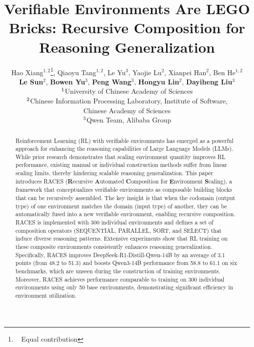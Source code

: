 \documentclass{article}
\title{Verifiable Environments Are LEGO Bricks: Recursive Composition for Reasoning Generalization}
\author{
\hspace{-2px}
Hao Xiang${}^{1,2}$\thanks{~ Equal contribution},
Qiaoyu Tang${}^{1,2}$\footnotemark[1],
Le Yu${}^{3}$,
Yaojie Lu${}^{2}$,
Xianpei Han${}^{2}$,
Ben He${}^{1,2}$
\\
\textbf{Le Sun}${}^{2}$,
\textbf{Bowen Yu}${}^{3}$,
\textbf{Peng Wang}${}^{3}$,
\textbf{Hongyu Lin}${}^{2}$,
\textbf{Dayiheng Liu}${}^{3}$ 
\vspace{5px}
\\
$^{\rm 1}$University of Chinese Academy of Sciences \vspace{3px}  \\
$^{\rm 2}$Chinese Information Processing Laboratory, Institute of Software, \\Chinese Academy of Sciences \vspace{3px}  \\
$^{\rm 3}$Qwen Team, Alibaba Group 
}
\begin{document}
\maketitle
\let\thefootnote\relax{}


\begin{abstract}
Reinforcement Learning (RL) with verifiable environments has emerged as a powerful approach for enhancing the reasoning capabilities of Large Language Models (LLMs).
While prior research demonstrates that scaling environment quantity improves RL performance, existing manual or individual construction methods suffer from linear scaling limits, thereby hindering scalable reasoning generalization. 
This paper introduces RACES (\textbf{R}ecursive \textbf{A}utomated \textbf{C}omposition for \textbf{E}nvironment \textbf{S}caling), a framework that conceptualizes verifiable environments as composable building blocks that can be recursively assembled.
The key insight is that when the codomain (output type) of one environment matches the domain (input type) of another, they can be automatically fused into a new verifiable environment, enabling recursive composition.
RACES is implemented with 300 individual environments and defines a set of composition operators (\textsc{SEQUENTIAL}, \textsc{PARALLEL}, \textsc{SORT}, and \textsc{SELECT}) that induce diverse reasoning patterns.
Extensive experiments show that RL training on these composite environments consistently enhances reasoning generalization. 
Specifically, RACES improves DeepSeek-R1-Distill-Qwen-14B by an average of 3.1 points (from 48.2 to 51.3) and boosts Qwen3-14B performance from 58.8 to 61.1 on six benchmarks, which are unseen during the construction of training environments. 
Moreover, RACES achieves performance comparable to training on 300 individual environments using only 50 base environments, demonstrating significant efficiency in environment utilization.
\end{abstract}












\newpage
\appendix



\newpage
% 
\end{document}
